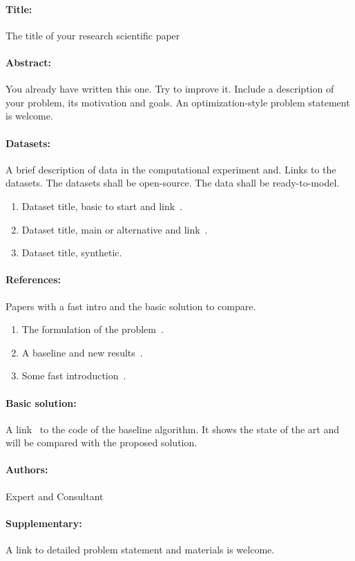 \documentclass[12pt]{article}
\begin{document}
\paragraph{Title:} The title of your research scientific paper

\paragraph{Abstract:} You already have written this one. Try to improve it. Include a description of your problem, its motivation  and goals. An optimization-style problem statement is welcome.

\paragraph{Datasets:}  A brief description of data in the computational experiment and. Links to the datasets. The datasets shall be open-source. The data shall be ready-to-model.
\begin{enumerate}
\item Dataset title, basic to start and link~\cite{potanin2019genetic}.
\item Dataset title, main or alternative and link~\cite{potanin2019genetic}.
\item Dataset title, synthetic. 
\end{enumerate}

\paragraph{References:}  Papers with a fast intro and the basic solution to compare.
\begin{enumerate}
\item The formulation of the problem~\cite{potanin2019genetic}.
\item A baseline and new results~\cite{potanin2019genetic}.
\item Some fast introduction~\cite{potanin2019genetic}.
\end{enumerate}

\paragraph{Basic solution:} A link~\cite{potanin2019genetic} to the code of the baseline algorithm. It shows the state of the art and will be compared with the proposed solution.

\paragraph{Authors:} Expert and Consultant

\paragraph{Supplementary:}  A link to detailed problem statement and materials is welcome.



\end{document}
